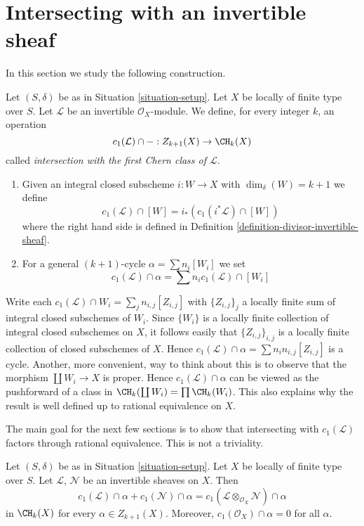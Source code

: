\section{Intersecting with an invertible sheaf}
\label{section-intersecting-with-divisors}

\noindent
In this section we study the following construction.

\begin{definition}
\label{definition-cap-c1}
Let $(S, \delta)$ be as in Situation \ref{situation-setup}.
Let $X$ be locally of finite type over $S$.
Let $\mathcal{L}$ be an invertible $\mathcal{O}_X$-module.
We define, for every integer $k$, an operation
$$
c_1(\mathcal{L}) \cap - :
Z_{k + 1}(X) \to \CH_k(X)
$$
called {\it intersection with the first Chern class of $\mathcal{L}$}.
\begin{enumerate}
\item Given an integral closed subscheme $i : W \to X$ with
$\dim_\delta(W) = k + 1$ we define
$$
c_1(\mathcal{L}) \cap [W] = i_*(c_1({i^*\mathcal{L}}) \cap [W])
$$
where the right hand side is defined in
Definition \ref{definition-divisor-invertible-sheaf}.
\item For a general $(k + 1)$-cycle $\alpha = \sum n_i [W_i]$ we set
$$
c_1(\mathcal{L}) \cap \alpha = \sum n_i c_1(\mathcal{L}) \cap [W_i]
$$
\end{enumerate}
\end{definition}

\noindent
Write each $c_1(\mathcal{L}) \cap W_i = \sum_j n_{i, j} [Z_{i, j}]$
with $\{Z_{i, j}\}_j$ a locally finite sum
of integral closed subschemes of $W_i$. Since $\{W_i\}$ is a locally
finite collection of integral closed subschemes on $X$, it follows
easily that $\{Z_{i, j}\}_{i, j}$ is a locally finite collection
of closed subschemes of $X$. Hence
$c_1(\mathcal{L}) \cap \alpha = \sum n_in_{i, j}[Z_{i, j}]$
is a cycle. Another, more convenient, way to think about this
is to observe that the morphism $\coprod W_i \to X$ is
proper. Hence $c_1(\mathcal{L}) \cap \alpha$ can be viewed
as the pushforward of a class in $\CH_k(\coprod W_i) = \prod \CH_k(W_i)$.
This also explains why the result is well defined up to rational
equivalence on $X$.

\medskip\noindent
The main goal for the next few sections is to show that intersecting with
$c_1(\mathcal{L})$ factors through rational equivalence.
This is not a triviality.

\begin{lemma}
\label{lemma-c1-cap-additive}
Let $(S, \delta)$ be as in Situation \ref{situation-setup}.
Let $X$ be locally of finite type over $S$.
Let $\mathcal{L}$, $\mathcal{N}$ be an invertible sheaves on $X$.
Then
$$
c_1(\mathcal{L}) \cap \alpha  + c_1(\mathcal{N}) \cap \alpha =
c_1(\mathcal{L} \otimes_{\mathcal{O}_X} \mathcal{N}) \cap \alpha
$$
in $\CH_k(X)$ for every $\alpha \in Z_{k + 1}(X)$. Moreover,
$c_1(\mathcal{O}_X) \cap \alpha = 0$ for all $\alpha$.
\end{lemma}

